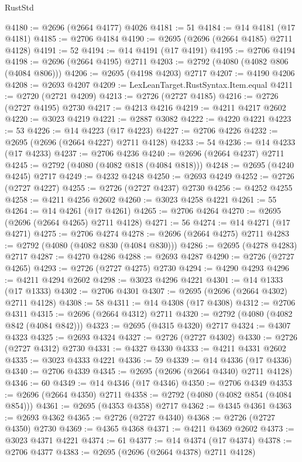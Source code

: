 \begin{lexlean}{RustStd}
\begin{coremodule}
@4180 := @2696 (@2664 @4177) @4026
@4181 := 51
@4184 := @14 @4181 (@17 @4181)
@4185 := @2706 @4184
@4190 := @2695 (@2696 (@2664 @4185) @2711 @4128)
@4191 := 52
@4194 := @14 @4191 (@17 @4191)
@4195 := @2706 @4194
@4198 := @2696 (@2664 @4195) @2711
@4203 := @2792 (@4080 (@4082 @806 (@4084 @806)))
@4206 := @2695 (@4198 @4203) @2717
@4207 := @4190 @4206
@4208 := @2693 @4207
@4209 := LexLeanTarget.RustSyntax.Item.equal
@4211 := @2720 (@2721 @4209)
@4213 := @2726 (@2727 @4185)
@4216 := @2726 (@2727 @4195) @2730
@4217 := @4213 @4216
@4219 := @4211 @4217 @2602
@4220 := @3023 @4219
@4221 := @2887 @3082
@4222 := @4220 @4221
@4223 := 53
@4226 := @14 @4223 (@17 @4223)
@4227 := @2706 @4226
@4232 := @2695 (@2696 (@2664 @4227) @2711 @4128)
@4233 := 54
@4236 := @14 @4233 (@17 @4233)
@4237 := @2706 @4236
@4240 := @2696 (@2664 @4237) @2711
@4245 := @2792 (@4080 (@4082 @818 (@4084 @818)))
@4248 := @2695 (@4240 @4245) @2717
@4249 := @4232 @4248
@4250 := @2693 @4249
@4252 := @2726 (@2727 @4227)
@4255 := @2726 (@2727 @4237) @2730
@4256 := @4252 @4255
@4258 := @4211 @4256 @2602
@4260 := @3023 @4258 @4221
@4261 := 55
@4264 := @14 @4261 (@17 @4261)
@4265 := @2706 @4264
@4270 := @2695 (@2696 (@2664 @4265) @2711 @4128)
@4271 := 56
@4274 := @14 @4271 (@17 @4271)
@4275 := @2706 @4274
@4278 := @2696 (@2664 @4275) @2711
@4283 := @2792 (@4080 (@4082 @830 (@4084 @830)))
@4286 := @2695 (@4278 @4283) @2717
@4287 := @4270 @4286
@4288 := @2693 @4287
@4290 := @2726 (@2727 @4265)
@4293 := @2726 (@2727 @4275) @2730
@4294 := @4290 @4293
@4296 := @4211 @4294 @2602
@4298 := @3023 @4296 @4221
@4301 := @14 @1333 (@17 @1333)
@4302 := @2706 @4301
@4307 := @2695 (@2696 (@2664 @4302) @2711 @4128)
@4308 := 58
@4311 := @14 @4308 (@17 @4308)
@4312 := @2706 @4311
@4315 := @2696 (@2664 @4312) @2711
@4320 := @2792 (@4080 (@4082 @842 (@4084 @842)))
@4323 := @2695 (@4315 @4320) @2717
@4324 := @4307 @4323
@4325 := @2693 @4324
@4327 := @2726 (@2727 @4302)
@4330 := @2726 (@2727 @4312) @2730
@4331 := @4327 @4330
@4333 := @4211 @4331 @2602
@4335 := @3023 @4333 @4221
@4336 := 59
@4339 := @14 @4336 (@17 @4336)
@4340 := @2706 @4339
@4345 := @2695 (@2696 (@2664 @4340) @2711 @4128)
@4346 := 60
@4349 := @14 @4346 (@17 @4346)
@4350 := @2706 @4349
@4353 := @2696 (@2664 @4350) @2711
@4358 := @2792 (@4080 (@4082 @854 (@4084 @854)))
@4361 := @2695 (@4353 @4358) @2717
@4362 := @4345 @4361
@4363 := @2693 @4362
@4365 := @2726 (@2727 @4340)
@4368 := @2726 (@2727 @4350) @2730
@4369 := @4365 @4368
@4371 := @4211 @4369 @2602
@4373 := @3023 @4371 @4221
@4374 := 61
@4377 := @14 @4374 (@17 @4374)
@4378 := @2706 @4377
@4383 := @2695 (@2696 (@2664 @4378) @2711 @4128)

\end{coremodule}
\end{lexlean}
